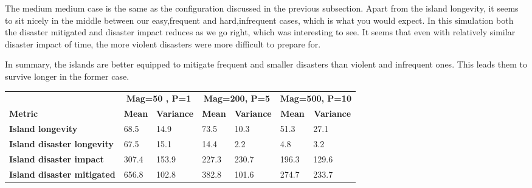 The medium medium case is the same as the configuration discussed in the previous subsection. Apart from the island longevity, it seems to sit nicely in the middle between our easy,frequent and hard,infrequent cases, which is what you would expect. In this simulation both the disaster mitigated and disaster impact reduces as we go right, which was interesting to see. It seems that even with relatively similar disaster impact of time, the more violent disasters were more difficult to prepare for.

In summary, the islands are better equipped to mitigate frequent and smaller disasters than violent and infrequent ones. This leads them to survive longer in the former case.
\begin{table}[h]
\begin{tabular}{l|ll|ll|ll}
                                     & \multicolumn{2}{c}{\textbf{Mag=50 , P=1}}                             & \multicolumn{2}{c}{\textbf{Mag=200, P=5}}                                     & \multicolumn{2}{c}{\textbf{Mag=500, P=10}}                               \\
\textbf{Metric}                      & \multicolumn{1}{c}{\textbf{Mean}} & \multicolumn{1}{c}{\textbf{Variance}} & \multicolumn{1}{c}{\textbf{Mean}} & \multicolumn{1}{c}{\textbf{Variance}} & \multicolumn{1}{c}{\textbf{Mean}} & \multicolumn{1}{c}{\textbf{Variance}} \\ \hline
\textbf{Island longevity}            & 68.5                              & 14.9                                 & 73.5                              & 10.3                                 & 51.3                              & 27.1                                  \\
\textbf{Island disaster longevity}   & 67.5                              & 15.1                                 & 14.4                              & 2.2                                  & 4.8                               & 3.2                                   \\
\textbf{Island disaster impact}      & 307.4                             & 153.9                                & 227.3                             & 230.7                                & 196.3                             & 129.6                                 \\
\textbf{Island disaster mitigated}   & 656.8                             & 102.8                                & 382.8                             & 101.6                                & 274.7                             & 233.7                                 \\

\end{tabular}
\end{table}
